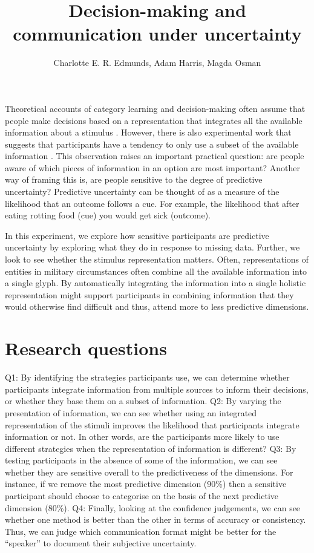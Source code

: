 \documentclass[doc, a4paper, apacite]{apa6}
\title{Decision-making and communication under uncertainty}
\author{Charlotte E. R. Edmunds, Adam Harris, Magda Osman}
\affiliation{Queen Mary, UCL, University of London \\ 11 January 2021}
\begin{document}
	\doublespacing
	
Theoretical accounts of category learning and decision-making often assume that people make decisions based on a representation that integrates all the available information about a stimulus \cite{Pothos2011}.  
However, there is also experimental work that suggests that participants have a tendency to only use a subset of the available information \cite{Edmunds2020, Wills2015}. 
This observation raises an important practical question: are people aware of which pieces of information in an option are most important?
Another way of framing this is, are people sensitive to the degree of predictive uncertainty?
Predictive uncertainty can be thought of as a measure of the likelihood that an outcome follows a cue. 
For example, the likelihood that after eating rotting food (cue) you would get sick (outcome). 

In this experiment, we explore how sensitive participants are predictive uncertainty by exploring what they do in response to missing data. 
Further, we look to see whether the stimulus representation matters.
 Often, representations of entities in military circumstances often combine all the available information into a single glyph. 
By automatically integrating the information into a single holistic representation might support participants in combining information that they would otherwise find difficult and thus, attend more to less predictive dimensions. 


\section{Research questions}
Q1: By identifying the strategies participants use, we can determine whether participants integrate information from multiple sources to inform their decisions, or whether they base them on a subset of information. 
Q2: By varying the presentation of information, we can see whether using an integrated representation of the stimuli improves the likelihood that participants integrate information or not. In other words, are the participants more likely to use different strategies when the representation of information is different?
Q3: By testing participants in the absence of some of the information, we can see whether they are sensitive overall to the predictiveness of the dimensions. For instance, if we remove the most predictive dimension (90\%) then a sensitive participant should choose to categorise on the basis of the next predictive dimension (80\%). 
Q4: Finally, looking at the confidence judgements, we can see whether one method is better than the other in terms of accuracy or consistency. Thus, we can judge which communication format might be better for the “speaker” to document their subjective uncertainty.   
\end{document}
